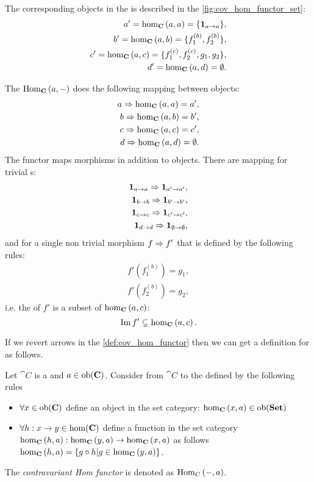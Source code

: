 \begin{example}
The corresponding
objects in the  is described in the
\cref{fig:cov_hom_functor_set}: 
\begin{eqnarray}
a' = \catmset[C]{a}{a} = \{\idm{a}\},
\nonumber \\
b' = \catmset[C]{a}{b} = \{f_1^{(b)}, f_2^{(b)}\}, 
\nonumber \\
c' = \catmset[C]{a}{c} = \{f_1^{(c)}, f_2^{(c)}, g_1, g_2\}, 
\nonumber \\
d' = \catmset[C]{a}{d} = \emptyset.
\nonumber
\end{eqnarray}

The $\mathrm{Hom}_{\mathbf{C}}\left(a, -\right)$ does the following mapping between objects:
\begin{eqnarray}
a \tof \catmset[C]{a}{a} = a',
\nonumber \\
b \tof \catmset[C]{a}{b} = b', 
\nonumber \\
c \tof \catmset[C]{a}{c} = c', 
\nonumber \\
d \tof \catmset[C]{a}{d} = \emptyset.
\nonumber
\end{eqnarray}
The functor maps morphisms in addition to objects. There are mapping
for trivial s: 
\begin{eqnarray}
\mathbf{1}_{ a \to a } \Rightarrow \mathbf{1}_{ a' \to a' },
\nonumber \\
\mathbf{1}_{ b \to b } \Rightarrow \mathbf{1}_{ b' \to b' },
\nonumber \\
\mathbf{1}_{ c \to c } \Rightarrow \mathbf{1}_{ c' \to c' },
\nonumber \\
\mathbf{1}_{ d \to d } \Rightarrow \mathbf{1}_{ \emptyset \to \emptyset },
\nonumber
\end{eqnarray}
and for a single non trivial morphism $f \Rightarrow f'$ that is defined by
the following rules:
\begin{eqnarray}
f'(f_1^{(b)}) = g_1,
\nonumber \\
f'(f_2^{(b)}) = g_2,
\nonumber
\end{eqnarray}
i.e. the  of $f'$ is a subset of
$\catmset[C]{a}{c}$:
\[
\Ima{f'} \subsetneq \catmset[C]{a}{c}.
\]
\end{example}

If we revert arrows in the \cref{def:cov_hom_functor} then we can get
a definition for  as follows.
\begin{definition}
\label{def:con_hom_functor}
Let $\cat{C}$ is a  and $a \in
\mathrm{ob}(\mathbf{C})$. Consider  from $\cat{C}$ to the
 defined by the following rules
\begin{itemize}
\item $\forall x \in \mathrm{ob}(\mathbf{C})$ define an object in the set category:
  $\catmset[C]{x}{a} \in \catob{Set}$ 
\item $\forall h: x \to y \in \mathrm{hom}(\mathbf{C})$ define a function in the set category
  $\catmset[C]{h}{a}: \catmset[C]{y}{a} \to \catmset[C]{x}{a}$ as follows
  $\catmset[C]{h}{a} = \{g \circ h | g \in \catmset[C]{y}{a}\}$.
\end{itemize}  
The \textit{contravariant Hom functor} is denoted as $\mathrm{Hom}_{C}\left(-, a\right)$.
\end{definition}

